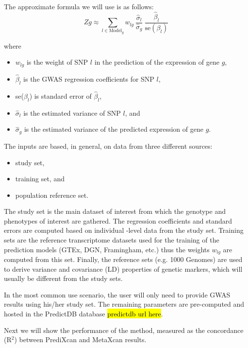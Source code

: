 \documentclass[10pt]{article}
\begin{document}
The approximate formula we will use is as follows:
\begin{equation}
Zg \approx \sum_{l\in \text{Model}_g} w_{lg} ~\frac{\hat\sigma_l}{\hat\sigma_g} ~  \frac{\hat\beta_l}{\text{se}(\beta_l)} 
\end{equation}

where

\begin{itemize}
\item $w_{lg}$ is the weight of SNP $l$ in the prediction of the expression of gene $g$,
\item $\hat\beta_l$ is the GWAS regression coefficients for SNP $l$,
\item se($\beta_l$) is standard error of $\hat\beta_l$,
\item $\hat\sigma_l$ is the estimated variance of SNP $l$, and
\item $\hat\sigma_g$ is the estimated variance of the predicted expression of gene $g$.
\end{itemize}

The inputs are based, in general, on data from three different sources: 
\begin{itemize}
\item study set,
\item training set, and
\item population reference set. 
\end{itemize}
The study set is the main dataset of interest from which the genotype and phenotypes of interest are gathered. The regression coefficients and standard errors are computed based on individual -level data from the study set. Training sets are the reference transcriptome datasets used for the training of the prediction models (GTEx, DGN, Framingham, etc.) thus the weights $w_{lg}$ are computed from this set. Finally, the reference sets (e.g. 1000 Genomes) are used to derive variance and covariance (LD) properties of genetic markers, which will usually be different from the study sets.

In the most common use scenario, the user will only need to provide GWAS results using his/her study set. The remaining parameters are pre-computed and hosted in the PredictDB database \hl{predictdb url here}.

Next we will show the performance of the method, measured as the concordance (R$^2$) between PrediXcan and MetaXcan results.
\end{document}
